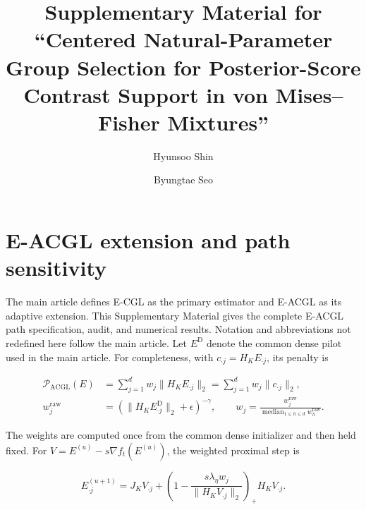 \documentclass[preprint,12pt,authoryear]{elsarticle}
\begin{document}
\begin{frontmatter}
\title{Supplementary Material for ``Centered Natural-Parameter Group Selection for Posterior-Score Contrast Support in von Mises--Fisher Mixtures''}
\author[aff1]{Hyunsoo Shin}
\author[aff1]{Byungtae Seo}
\address[aff1]{Department of Statistics, Sungkyunkwan University, Seoul 03063, Republic of Korea}
\end{frontmatter}

\renewcommand{\thetable}{S\arabic{table}}
\renewcommand{\thefigure}{S\arabic{figure}}
\renewcommand{\thesection}{S\arabic{section}}
\renewcommand{\theequation}{S\arabic{equation}}

\section{E-ACGL extension and path sensitivity}
\label{sec:s-eacgl-path}

The main article defines E-CGL as the primary estimator and E-ACGL as its
adaptive extension. This Supplementary Material gives the complete E-ACGL path specification, audit, and numerical
results. Notation and abbreviations not redefined here follow the main article.
Let $E^{\mathrm D}$ denote the common dense pilot used in the main
article. For completeness, with $c_{\cdot j}=H_KE_{\cdot j}$, its penalty is

\begin{equation}
\label{eq:supp-eacgl-penalty}
\begin{aligned}
\mathcal P_{\mathrm{ACGL}}(E)
&=\sum_{j=1}^d
w_j\lVert H_KE_{\cdot j}\rVert_2
=\sum_{j=1}^d
w_j\lVert c_{\cdot j}\rVert_2,\\
w_j^{\mathrm{raw}}
&=\left(\lVert H_KE_{\cdot j}^{\mathrm D}\rVert_2
+\epsilon\right)^{-\gamma},
\qquad
w_j
=\frac{w_j^{\mathrm{raw}}}
{\operatorname{median}_{1\leq h\leq d}w_h^{\mathrm{raw}}}.
\end{aligned}
\end{equation}

The weights are computed once from the common dense initializer and then held
fixed. For
$V=E^{(u)}-s\nabla f_t(E^{(u)})$, the weighted proximal step is

\begin{equation}
\label{eq:supp-eacgl-prox}
E_{\cdot j}^{(u+1)}
=J_KV_{\cdot j}
+\left(
1-\frac{s\lambda_\eta w_j}
{\lVert H_KV_{\cdot j}\rVert_2}
\right)_+H_KV_{\cdot j}.
\end{equation}
\end{document}
